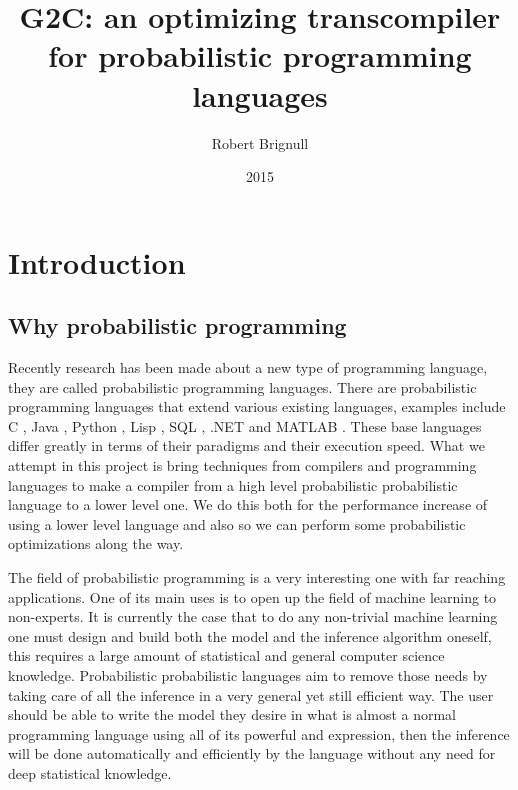 \documentclass[a4paper]{article}
\title{G2C: an optimizing transcompiler for probabilistic programming languages}
\author{Robert Brignull}
\date{2015}
\begin{document}
\maketitle


\section{Introduction}

\subsection{Why probabilistic programming}

Recently research has been made about a new type of programming language, they are called probabilistic programming languages. There are probabilistic programming languages that extend various existing languages, examples include C \cite{ProbabilisticC}, Java \cite{BLOG}, Python \cite{PyMC}, Lisp \cite{Anglican} \cite{Venture} \cite{Church}, SQL \cite{PSQL}, .NET \cite{Infer.NET} and MATLAB \cite{dimple}. These base languages differ greatly in terms of their paradigms and their execution speed. What we attempt in this project is bring techniques from compilers and programming languages to make a compiler from a high level probabilistic probabilistic language to a lower level one. We do this both for the performance increase of using a lower level language and also so we can perform some probabilistic optimizations along the way.

The field of probabilistic programming is a very interesting one with far reaching applications. One of its main uses is to open up the field of machine learning to non-experts. It is currently the case that to do any non-trivial machine learning one must design and build both the model and the inference algorithm oneself, this requires a large amount of statistical and general computer science knowledge. Probabilistic probabilistic languages aim to remove those needs by taking care of all the inference in a very general yet still efficient way. The user should be able to write the model they desire in what is almost a normal programming language using all of its powerful and expression, then the inference will be done automatically and efficiently by the language without any need for deep statistical knowledge.
\end{document}

